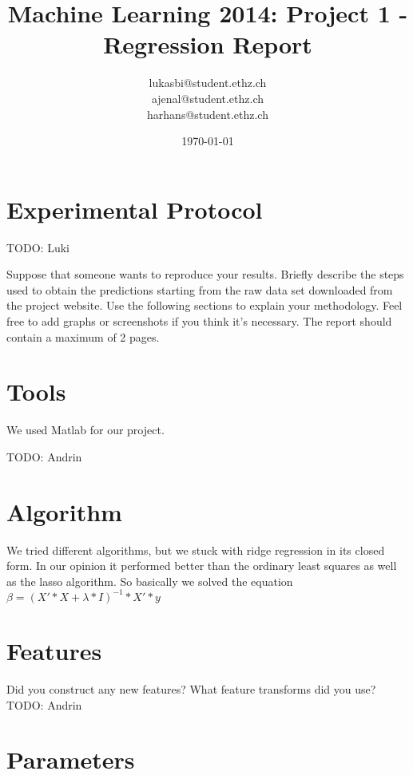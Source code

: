 \documentclass[a4paper, 11pt]{article}
\title{Machine Learning 2014: Project 1 - Regression Report}
\author{lukasbi@student.ethz.ch\\ ajenal@student.ethz.ch\\ harhans@student.ethz.ch\\}
\date{\today}
\begin{document}
\lstset{language=Matlab} 
\maketitle

\section*{Experimental Protocol}

TODO: Luki

Suppose that someone wants to reproduce your results. Briefly describe the steps used to obtain the
predictions starting from the raw data set downloaded from the project website. Use the following
sections to explain your methodology. Feel free to add graphs or screenshots if you think it's
necessary. The report should contain a maximum of 2 pages.

\section{Tools}
We used Matlab for our project. 

TODO: Andrin


\section{Algorithm}
We tried different algorithms, but we stuck with ridge regression in its closed form. In our opinion it performed better than the ordinary least squares as well as the lasso algorithm.
So basically we solved the equation 
\begin{math}
\beta = (X'*X+\lambda*I)^{-1}*X'*y
\end{math}

\section{Features}
Did you construct any new features? What feature transforms did you use? TODO: Andrin

\section{Parameters}
\end{document}
